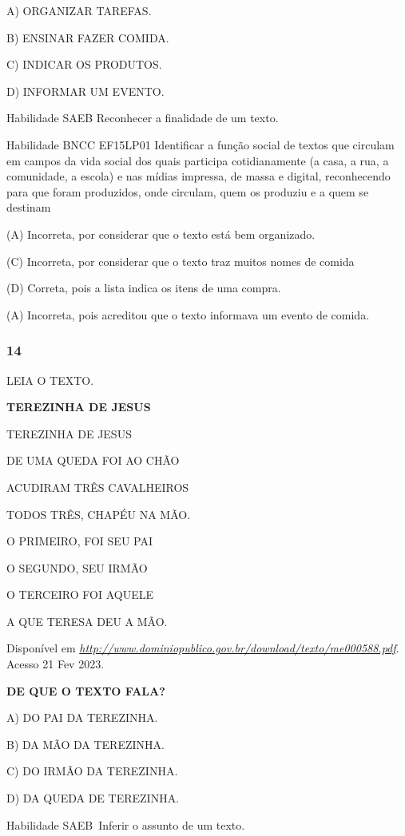 A) ORGANIZAR TAREFAS.

B) ENSINAR FAZER COMIDA.

C) INDICAR OS PRODUTOS.

D) INFORMAR UM EVENTO.

Habilidade SAEB Reconhecer a finalidade de um texto.

Habilidade BNCC EF15LP01 Identificar a função social de textos que
circulam em campos da vida social dos quais participa cotidianamente (a
casa, a rua, a comunidade, a escola) e nas mídias impressa, de massa e
digital, reconhecendo para que foram produzidos, onde circulam, quem os
produziu e a quem se destinam

(A) Incorreta, por considerar que o texto está bem organizado.

(C) Incorreta, por considerar que o texto traz muitos nomes de comida

(D) Correta, pois a lista indica os itens de uma compra.

(A) Incorreta, pois acreditou que o texto informava um evento de comida.

\subsubsection{14}\label{section-70}

LEIA O TEXTO.

\textbf{TEREZINHA DE JESUS}

TEREZINHA DE JESUS

DE UMA QUEDA FOI AO CHÃO

ACUDIRAM TRÊS CAVALHEIROS

TODOS TRÊS, CHAPÉU NA MÃO.

O PRIMEIRO, FOI SEU PAI

O SEGUNDO, SEU IRMÃO

O TERCEIRO FOI AQUELE

A QUE TERESA DEU A MÃO.

Disponível em
\href{http://www.dominiopublico.gov.br/download/texto/me000588.pdf}{\emph{http://www.dominiopublico.gov.br/download/texto/me000588.pdf}}.
Acesso 21 Fev 2023.

\textbf{DE QUE O TEXTO FALA?}

A) DO PAI DA TEREZINHA.

B) DA MÃO DA TEREZINHA.

C) DO IRMÃO DA TEREZINHA.

D) DA QUEDA DE TEREZINHA.

Habilidade SAEB~Inferir o assunto de um texto.

